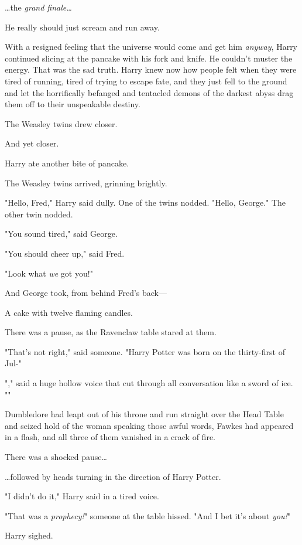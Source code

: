 {\ldots}the \emph{grand finale{\ldots}}

He really should just scream and run away.

With a resigned feeling that the universe would come and get him \emph{anyway}, 
Harry continued slicing at the pancake with his fork and knife. He couldn't 
muster the energy. That was the sad truth. Harry knew now how people felt when 
they were tired of running, tired of trying to escape fate, and they just fell 
to the ground and let the horrifically befanged and tentacled demons of the 
darkest abyss drag them off to their unspeakable destiny.

The Weasley twins drew closer.

And yet closer.

Harry ate another bite of pancake.

The Weasley twins arrived, grinning brightly.

"Hello, Fred," Harry said dully. One of the twins nodded. "Hello, George." The 
other twin nodded.

"You sound tired," said George.

"You should cheer up," said Fred.

"Look what \emph{we} got you!"

And George took, from behind Fred's back---

A cake with twelve flaming candles.

There was a pause, as the Ravenclaw table stared at them.

"That's not right," said someone. "Harry Potter was born on the thirty-first of 
Jul-"

"," said a huge hollow voice that cut through all 
conversation like a sword of ice. ""

Dumbledore had leapt out of his throne and run straight over the Head Table and 
seized hold of the woman speaking those awful words, Fawkes had appeared in a 
flash, and all three of them vanished in a crack of fire.

There was a shocked pause{\ldots}

{\ldots}followed by heads turning in the direction of Harry Potter.

"I didn't do it," Harry said in a tired voice.

"That was a \emph{prophecy!}" someone at the table hissed. "And I bet it's 
about \emph{you!}"

Harry sighed.

